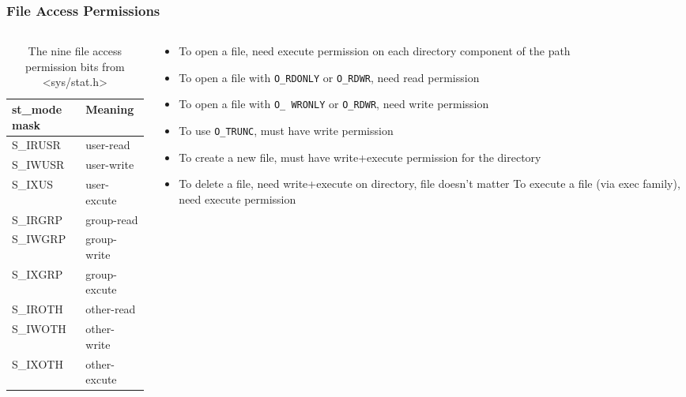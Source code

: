 \documentclass[newPxFont,sthlmFooter,nooffset]{beamer}
\newcommand\Fontvi{\fontsize{10}{11}\selectfont}
\begin{document}
\begin{frame}[t]
  \frametitle{File Access Permissions}
\Fontvi
  \begin{columns}[T]
    \begin{column}{0.4\textwidth}
      \begin{table}[h]\label{fig:4.6}
        \centering
        \begin{tabular}{l | l}
          st\_mode mask & Meaning \\ \hline
          S\_IRUSR & user-read   \\
          S\_IWUSR & user-write  \\
          S\_IXUS  & user-excute \\ \hline
          S\_IRGRP & group-read   \\
          S\_IWGRP & group-write  \\
          S\_IXGRP & group-excute \\ \hline
          S\_IROTH & other-read   \\
          S\_IWOTH & other-write  \\
          S\_IXOTH & other-excute \\ 
        \end{tabular}
        \caption{The nine file access permission bits from <sys/stat.h>}
        \end{table}
    \end{column}
    \begin{column}{0.6\textwidth}
      \begin{itemize}
      \item To open a file, need execute permission on each directory
        component of the path
      \item To open a file with \texttt{O\_RDONLY} or
        \texttt{O\_RDWR}, need read permission
      \item To open a file with \texttt{O\_ WRONLY} or
        \texttt{O\_RDWR}, need write permission
      \item To use \texttt{O\_TRUNC}, must have write permission
      \item To create a new file, must have write+execute permission
        for the directory
      \item To delete a file, need write+execute on directory, file
        doesn’t matter To execute a file (via exec family), need
        execute permission
      \end{itemize}
    \end{column}
  \end{columns}

\end{frame}
\end{document}
